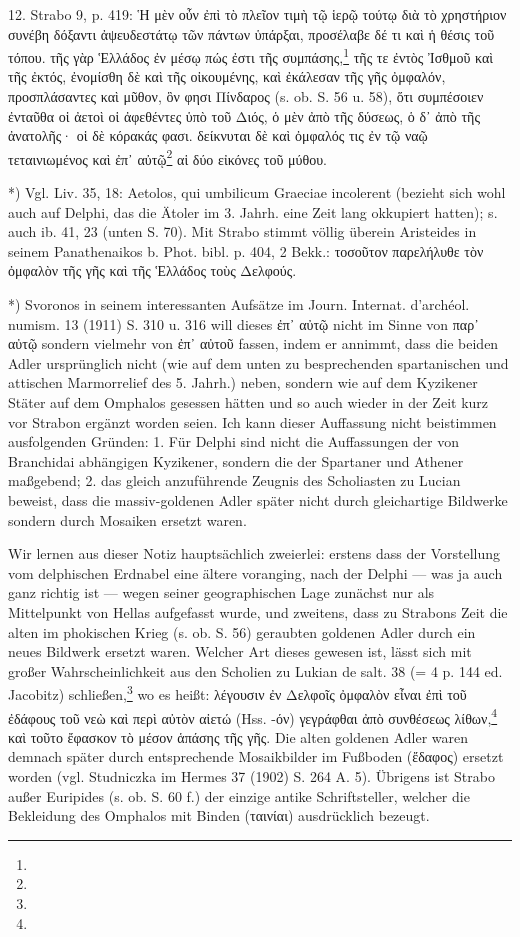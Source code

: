 \documentclass[a4paper, 11pt, oneside]{article}
\begin{document}
12. Strabo 9, p. 419: Ἡ μὲν οὖν ἐπὶ τὸ πλεῖον τιμὴ τῷ ἱερῷ τούτῳ διὰ τὸ χρηστήριον συνέβη δόξαντι ἀψευδεστάτῳ τῶν πάντων ὑπάρξαι, προσέλαβε δέ τι καὶ ἡ θέσις τοῦ τόπου. τῆς γὰρ Ἑλλάδος ἐν μέσῳ πώς ἐστι τῆς συμπάσης,\footnote{} τῆς τε ἐντὸς Ἰσθμοῦ καὶ τῆς ἐκτός, ἐνομίσθη δὲ καὶ τῆς οἰκουμένης, καὶ ἐκάλεσαν τῆς γῆς ὀμφαλόν, προσπλάσαντες καὶ μῦθον, ὃν φησι Πίνδαρος (s. ob. S. 56 u. 58), ὅτι συμπέσοιεν ἐνταῦθα οἱ ἀετοὶ οἱ ἀφεθέντες ὑπὸ τοῦ Διός, ὁ μὲν ἀπὸ τῆς δύσεως, ὁ δ᾽ ἀπὸ τῆς ἀνατολῆς· οἱ δὲ κόρακάς φασι. δείκνυται δὲ καὶ ὀμφαλός τις ἐν τῷ ναῷ τεταινιωμένος καὶ ἐπ᾽ αὐτῷ\footnote{} αἱ δύο εἰκόνες τοῦ μύθου.

*) Vgl. Liv. 35, 18: Aetolos, qui umbilicum Graeciae incolerent (bezieht sich wohl auch auf Delphi, das die Ätoler im 3. Jahrh. eine Zeit lang okkupiert hatten); s. auch ib. 41, 23 (unten S. 70). Mit Strabo stimmt völlig überein Aristeides in seinem Panathenaikos b. Phot. bibl. p. 404, 2 Bekk.: τοσοῦτον παρελήλυθε τὸν ὀμφαλὸν τῆς γῆς καὶ τῆς Ἑλλάδος τοὺς Δελφούς.

*) Svoronos in seinem interessanten Aufsätze im Journ. Internat. d'archéol. numism. 13 (1911) S. 310 u. 316 will dieses ἐπ᾽ αὐτῷ nicht im Sinne von παρ᾽ αὐτῷ sondern vielmehr von ἐπ᾽ αὐτοῦ fassen, indem er annimmt, dass die beiden Adler ursprünglich nicht (wie auf dem unten zu besprechenden spartanischen und attischen Marmorrelief des 5. Jahrh.) neben, sondern wie auf dem Kyzikener Stäter auf dem Omphalos gesessen hätten und so auch wieder in der Zeit kurz vor Strabon ergänzt worden seien. Ich kann dieser Auffassung nicht beistimmen ausfolgenden Gründen: 1. Für Delphi sind nicht die Auffassungen der von Branchidai abhängigen Kyzikener, sondern die der Spartaner und Athener maßgebend; 2. das gleich anzuführende Zeugnis des Scholiasten zu Lucian beweist, dass die massiv-goldenen Adler später nicht durch gleichartige Bildwerke sondern durch Mosaiken ersetzt waren.

Wir lernen aus dieser Notiz hauptsächlich zweierlei: erstens dass der Vorstellung vom delphischen Erdnabel eine ältere voranging, nach der Delphi --- was ja auch ganz richtig ist --- wegen seiner geographischen Lage zunächst nur als Mittelpunkt von Hellas aufgefasst wurde, und zweitens, dass zu Strabons Zeit die alten im phokischen Krieg (s. ob. S. 56) geraubten goldenen Adler durch ein neues Bildwerk ersetzt waren. Welcher Art dieses gewesen ist, lässt sich mit großer Wahrscheinlichkeit aus den Scholien zu Lukian de salt. 38 (= 4 p. 144 ed. Jacobitz) schließen,\footnote{} wo es heißt: λέγουσιν ἐν Δελφοῖς ὀμφαλὸν εἶναι ἐπὶ τοῦ ἐδάφους τοῦ νεὼ καὶ περὶ αὐτὸν αἰετώ (Hss. -όν) γεγράφθαι ἀπὸ συνθέσεως λίθων,\footnote{} καὶ τοῦτο ἔφασκον τὸ μέσον ἁπάσης τῆς γῆς. Die alten goldenen Adler waren demnach später durch entsprechende Mosaikbilder im Fußboden (ἔδαφος) ersetzt worden (vgl. Studniczka im Hermes 37 (1902) S. 264 A. 5). Übrigens ist Strabo außer Euripides (s. ob. S. 60 f.) der einzige antike Schriftsteller, welcher die Bekleidung des Omphalos mit Binden (ταινίαι) ausdrücklich bezeugt.
\end{document}
